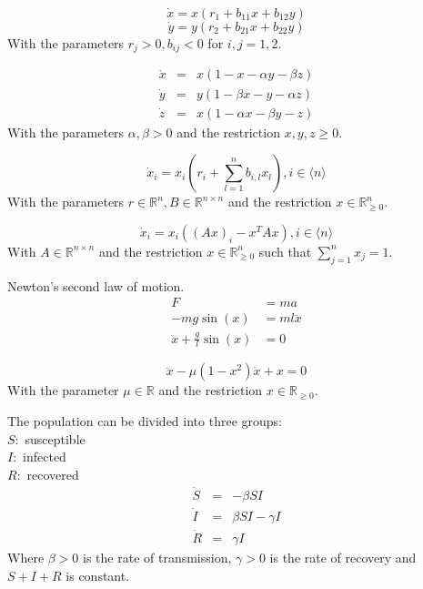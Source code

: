 \documentclass{article}
\newcommand*{\R}{\mathbb{R}}
\newcommand*{\jbr}[1]{{\langle #1 \rangle}}
\begin{document}
\begin{exam}
    $$\dot x=x(r_1+b_{11}x+b_{12}y)$$
    $$\dot y=y(r_2+b_{21}x+b_{22}y)$$
    With the parameters $r_j > 0, b_{ij} < 0$ for $i,j = 1,2$.
\end{exam}

\begin{exam}
    $$\begin{array}{rcl}\dot x &=& x(1-x-\alpha y-\beta z)\\
    \dot y &=& y(1-\beta x-y-\alpha z)\\
    \dot z &=& x(1-\alpha x-\beta y-z)
    \end{array}$$
    With the parameters $\alpha,\beta > 0$ and the restriction $x,y,z \geq 0$.
\end{exam}

\begin{exam}
    $$\dot x_i = x_i\left(r_i+\sum_{l = 1}^n b_{i,l}x_l\right), i\in\jbr{n}$$
    With the parameters $r \in \R^n, B \in \R^{n\times n}$ and the restriction $x \in \R^n_{\geq 0}$.
\end{exam}

\begin{exam}
    $$\dot x_i  = x_i((Ax)_i-x^TAx), i \in\jbr{n}$$
    With $A \in \R^{n\times n}$ and the restriction $x\in\R_{\geq0}^n$ such that $\sum_{j=1}^n x_j = 1$.
\end{exam}

\begin{exam}[Pendulum]
    Newton's second law of motion.
    $$\begin{aligned}F &= ma\\
    -mg\sin(x)&=ml\ddot x\\
    \ddot x + \frac{g}{l}\sin(x)&=0\end{aligned}$$
\end{exam}

\begin{exam}
    $$\ddot x-\mu(1-x^2)\dot x+x=0$$
    With the parameter $\mu \in \R$ and the restriction $x\in\R_{\geq0}$.
\end{exam}

\begin{exam}
    The population can be divided into three groups:\\
    $S:$ susceptible\\
    $I:$ infected\\
    $R:$ recovered
    $$\begin{array}{rcl}\dot S&=&-\beta SI\\
    \dot I&=&\beta SI - \gamma I\\
    \dot R&=&\gamma I
    \end{array}$$
    Where $\beta > 0$ is the rate of transmission, $\gamma > 0$ is the rate of recovery and $S+I+R$ is constant.
\end{exam}
\end{document}
